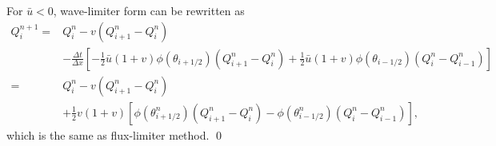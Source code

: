 \documentclass[11pt]{article}
\begin{document}
\begin{enumerate}
            For $\bar{u}<0$, wave-limiter form can be rewritten as 
        	\begin{align*}
        	Q_i^{n+1} = &Q_i^n-v(Q_{i+1}^n-Q_{i}^n)\\
			&-\frac{\Delta t}{\Delta x}[-\frac{1}{2}\bar{u}(1+v)\phi(\theta_{i+1/2})(Q_{i+1}^n-Q_{i}^n)+\frac{1}{2}\bar{u}(1+v)\phi(\theta_{i-1/2})(Q_{i}^n-Q_{i-1}^n)]\\
			= &Q_i^n-v(Q_{i+1}^n-Q_{i}^n)\\
			&+\frac{1}{2}v(1+v)[\phi(\theta_{i+1/2}^n)(Q_{i+1}^n-Q_i^n)-\phi(\theta_{i-1/2}^n)(Q_i^n-Q_{i-1}^n)],
        	\end{align*}
            which is the same as flux-limiter method.
\qed           

\end{enumerate}
\end{document}
